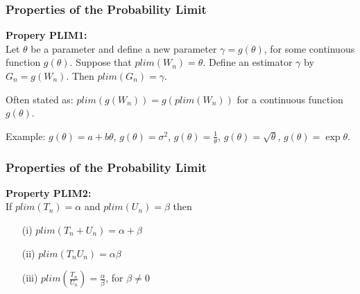 \documentclass[12pt]{beamer}
\begin{document}
\begin{frame}
\frametitle{Properties of the Probability Limit}
\textbf{Propery PLIM1:} \\

\vspace{3mm}
Let $\theta$ be a parameter and define a new parameter $\gamma = g(\theta)$, for some continuous function
$g(\theta)$. Suppose that $plim(W_{n}) = \theta$. Define an estimator $\gamma$ by $G_{n} = g(W_{n})$. Then
$plim(G_{n}) = \gamma$.

\vspace{3mm}
Often stated as: $plim(g(W_{n})) = g(plim(W_{n}))$ for a continuous function $g(\theta)$.

\vspace{3mm}
Example: $g(\theta) = a + b \theta$, $g(\theta) = \sigma^{2}$, $g(\theta) = \frac{1}{\theta}$,
         $g(\theta) = \sqrt{\theta}$, $g(\theta) = \exp{\theta}$.
\end{frame}


\begin{frame}
\frametitle{Properties of the Probability Limit}
\textbf{Property PLIM2:} \\

\vspace{5mm}
If $plim(T_{n}) = \alpha$ and $plim(U_{n}) = \beta$ then

\begin{itemize}
 \item[(i)]   $plim(T_{n} + U_{n}) = \alpha + \beta$
 \item[(ii)]  $plim(T_{n}U_{n}) = \alpha \beta$
 \item[(iii)] $plim\left(\frac{T_{n}}{U_{n}} \right) = \frac{\alpha}{\beta}$, for $\beta \neq 0$
\end{itemize}

\end{frame}
\end{document}
